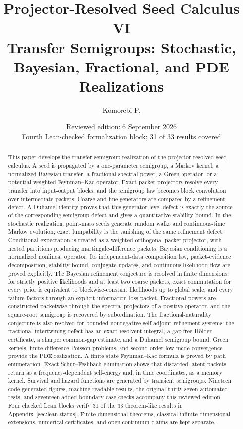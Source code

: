 \documentclass[11pt]{article}
\title{\textbf{Projector-Resolved Seed Calculus VI}\\[0.45em]
\large Transfer Semigroups: Stochastic, Bayesian, Fractional, and PDE Realizations}
\author{Komorebi P.}
\date{Reviewed edition: 6 September 2026\\\small Fourth Lean-checked formalization block; 31 of 33 results covered}
\theoremstyle{definition}
\theoremstyle{remark}
\begin{document}
\maketitle

\begin{abstract}
This paper develops the transfer-semigroup realization of the projector-resolved seed calculus. A seed is propagated by a one-parameter semigroup, a Markov kernel, a normalized Bayesian transfer, a fractional spectral power, a Green operator, or a potential-weighted Feynman--Kac operator. Exact packet projectors resolve every transfer into input-output blocks, and the semigroup law becomes block convolution over intermediate packets. Coarse and fine generators are compared by a refinement defect. A Duhamel identity proves that this generator-level defect is exactly the source of the corresponding semigroup defect and gives a quantitative stability bound. In the stochastic realization, point-mass seeds generate random walks and continuous-time Markov evolution; exact lumpability is the vanishing of the same refinement defect. Conditional expectation is treated as a weighted orthogonal packet projector, with nested partitions producing martingale-difference packets. Bayesian conditioning is a normalized nonlinear operator. Its independent-data composition law, packet-evidence decomposition, stability bound, conjugate updates, and continuous likelihood flow are proved explicitly.  The Bayesian refinement conjecture is resolved in finite dimensions: for strictly positive likelihoods and at least two coarse packets, exact commutation for every prior is equivalent to blockwise-constant likelihoods up to global scale, and every failure factors through an explicit information-loss packet. Fractional powers are constructed packetwise through the spectral projectors of a positive operator, and the square-root semigroup is recovered by subordination. The fractional-naturality conjecture is also resolved for bounded nonnegative self-adjoint refinement systems: the fractional intertwining defect has an exact resolvent integral, a gap-free Hölder certificate, a sharper common-gap estimate, and a Duhamel semigroup bound. Green kernels, finite-difference Poisson problems, and second-order low-mode convergence provide the PDE realization. A finite-state Feynman--Kac formula is proved by path enumeration. Exact Schur--Feshbach elimination shows that discarded latent packets return as a frequency-dependent self-energy and, in time coordinates, as a memory kernel. Survival and hazard functions are generated by transient semigroups. Nineteen code-generated figures, machine-readable results, the original thirty-seven automated tests, and seventeen added boundary-case checks accompany this reviewed edition. Four checked Lean blocks verify 31 of the 33 theorem-like results in Appendix~\ref{sec:lean-status}. Finite-dimensional theorems, classical infinite-dimensional extensions, numerical certificates, and open continuum claims are kept separate.
\end{abstract}
\end{document}
